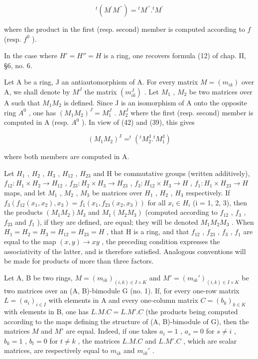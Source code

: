 \[
{ } ^ { t } ( M ^ { \prime } M ^ { \prime \prime } ) = { } ^ { t } M ^ { \prime \prime } . { } ^ { t } M ^ { \prime }\tag{42}
\]

where the product in the first (resp. second) member is computed according to \(f\) (resp. \(f^{0}\) ).

In the case where \(H' = H'' = H\) is a ring, one recovers formula (12) of chap. II, §6, no. 6.

Let A be a ring, J an antiautomorphism of A. For every matrix \(M = (m_{ik})\) over A, we shall denote by \(M^{J}\) the matrix \((m_{ik}^{J})\) . Let \(M_{1}\) , \(M_{2}\) be two matrices over A such that \(M_{1}M_{2}\) is defined. Since J is an isomorphism of A onto the opposite ring \(A^{0}\) , one has \((M_{1}M_{2})^{J} = M_{1}^{J}\) . \(M_{2}^{J}\) where the first (resp. second) member is computed in A (resp. \(A^{0}\) ). In view of (42) and (39), this gives

\[
(M _ {1} M _ {2}) ^ {\mathrm{J}} = ^ {t} (^ {t} M _ {2} ^ {\mathrm{J}}. ^ {t} M _ {1} ^ {\mathrm{J}})\tag{43}
\]

where both members are computed in A.

Let \(H_{1}\) , \(H_{2}\) , \(H_{3}\) , \(H_{12}\) , \(H_{23}\) and H be commutative groups (written additively), \(f_{12}: H_{1} \times H_{2} \to H_{12}\) , \(f_{23}: H_{2} \times H_{3} \to H_{23}\) , \(f_{3}: H_{12} \times H_{3} \to H\) , \(f_{1}: H_{1} \times H_{23} \to H\) maps, and let \(M_{1}\) , \(M_{2}\) , \(M_{3}\) be matrices over \(H_{1}\) , \(H_{2}\) , \(H_{3}\) respectively. If \(f_{3}(f_{12}(x_{1}, x_{2}), x_{3}) = f_{1}(x_{1}, f_{23}(x_{2}, x_{3}))\) for all \(x_{i} \in H_{i}\) (i = 1, 2, 3), then the products \((M_{1}M_{2})M_{3}\) and \(M_{1}(M_{2}M_{3})\) (computed according to \(f_{12}\) , \(f_{3}\) , \(f_{23}\) and \(f_{1}\) ), if they are defined, are equal; they will be denoted \(M_{1}M_{2}M_{3}\) . When \(H_{1} = H_{2} = H_{3} = H_{12} = H_{23} = H\) , that H is a ring, and that \(f_{12}\) , \(f_{23}\) , \(f_{3}\) , \(f_{1}\) are equal to the map \((x, y) \to xy\) , the preceding condition expresses the associativity of the latter, and is therefore satisfied. Analogous conventions will be made for products of more than three factors.

Let A, B be two rings, \(M = (m_{ik})_{(i,k) \in I \times K}\) and \(M' = (m_{ik}')_{(i,k) \in I \times K}\) be two matrices over an (A, B)-bimodule G (no. 1). If, for every one-row matrix \(L = (a_i)_{i \in I}\) with elements in A and every one-column matrix \(C = (b_k)_{k \in K}\) with elements in B, one has \(L.M.C = L.M'.C\) (the products being computed according to the maps defining the structure of (A, B)-bimodule of G), then the matrices \(M\) and \(M'\) are equal. Indeed, if one takes \(a_i = 1\) , \(a_s = 0\) for \(s \neq i\) , \(b_k = 1\) , \(b_t = 0\) for \(t \neq k\) , the matrices \(L.M.C\) and \(L.M'.C\) , which are scalar matrices, are respectively equal to \(m_{ik}\) and \(m_{ik}'\) .

